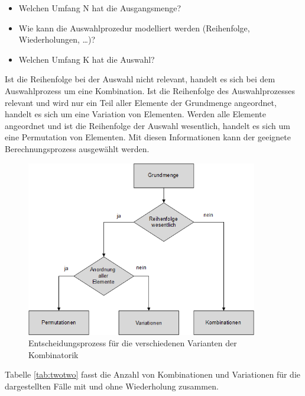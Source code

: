 \begin{itemize}
    \item Welchen Umfang N hat die Ausgangsmenge?
    \item Wie kann die Auswahlprozedur modelliert werden (Reihenfolge, Wiederholungen, {\dots})?
    \item Welchen Umfang K hat die Auswahl?
\end{itemize}

\noindent Ist die Reihenfolge bei der Auswahl nicht relevant, handelt es sich bei dem Auswahlprozess um eine Kombination. Ist die Reihenfolge des Auswahlprozesses relevant und wird nur ein Teil aller Elemente der Grundmenge angeordnet, handelt es sich um eine Variation von Elementen. Werden alle Elemente angeordnet und ist die Reihenfolge der Auswahl wesentlich, handelt es sich um eine Permutation von Elementen. Mit diesen Informationen kann der geeignete Berechnungsprozess ausgew\"{a}hlt werden.

\noindent 
\begin{figure}[H]
  \centerline{\includegraphics[width=0.9\textwidth]{Kapitel2/Bilder/image6}}
  \caption{Entscheidungsprozess für die verschiedenen Varianten der Kombinatorik}
  \label{fig:LandkarteKombinatorik}
\end{figure}

\clearpage

\noindent Tabelle \ref{tab:twotwo} fasst die Anzahl von Kombinationen und Variationen für die dargestellten Fälle mit und ohne Wiederholung zusammen. 

